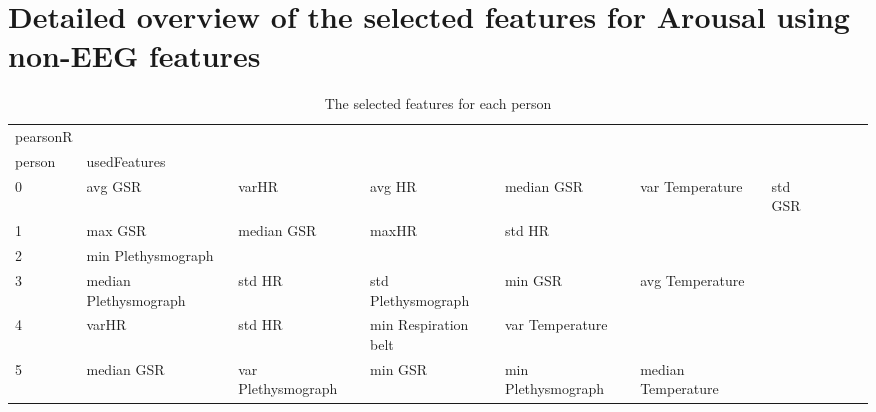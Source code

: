 \chapter{Detailed overview of the selected features for Arousal using non-EEG features}

\begin{landscape}
\begin{table}[]
\centering
\caption{The selected features for each person}
\begin{tabular}{l|llllllll}
pearsonR &                         &                       &                         &                         &                         &                       &                      &          &                      &        \\
person   & usedFeatures            &                       &                         &                         &                         &                       &                      &          &                      &        \\
0        & avg GSR                 & varHR                 & avg HR                  & median GSR              & var Temperature         & std GSR               &                      &          &                      &        \\
1        & max GSR                 & median GSR            & maxHR                   & std HR                  &                         &                       &                      &          &                      &        \\
2        & min Plethysmograph      &                       &                         &                         &                         &                       &                      &          &                      &        \\
3        & median Plethysmograph   & std HR                & std Plethysmograph      & min GSR                 & avg Temperature         &                       &                      &          &                      &        \\
4        & varHR                   & std HR                & min Respiration belt    & var Temperature         &                         &                       &                      &          &                      &        \\
5        & median GSR              & var Plethysmograph    & min GSR                 & min Plethysmograph      & median Temperature      &                       &                      &          &                      &        \\

\end{tabular}
\end{table}
\end{landscape}
